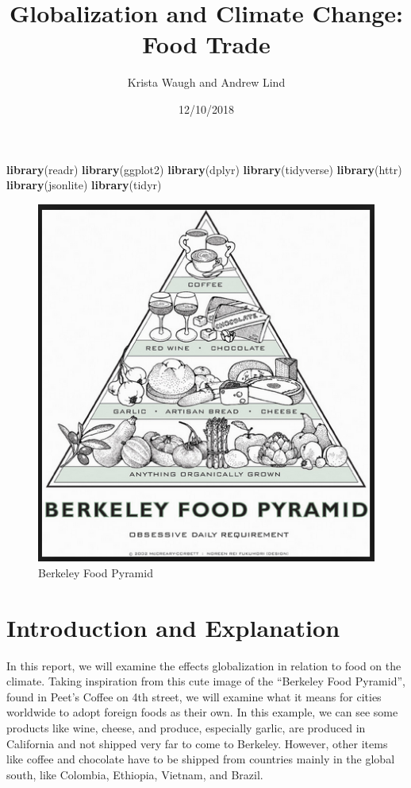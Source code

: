 \documentclass[]{article}
\title{Globalization and Climate Change: Food Trade}
\author{Krista Waugh and Andrew Lind}
\date{12/10/2018}
\newenvironment{Shaded}{\begin{snugshade}}{\end{snugshade}}
\newcommand{\KeywordTok}[1]{\textcolor[rgb]{0.13,0.29,0.53}{\textbf{#1}}}
\newcommand{\NormalTok}[1]{#1}
\begin{document}
\maketitle

\begin{Shaded}
\begin{Highlighting}[]
\KeywordTok{library}\NormalTok{(readr)}
\KeywordTok{library}\NormalTok{(ggplot2)}
\KeywordTok{library}\NormalTok{(dplyr)}
\KeywordTok{library}\NormalTok{(tidyverse)}
\KeywordTok{library}\NormalTok{(httr)}
\KeywordTok{library}\NormalTok{(jsonlite)}
\KeywordTok{library}\NormalTok{(tidyr)}
\end{Highlighting}
\end{Shaded}

\begin{figure}

{\centering \includegraphics[width=0.5\linewidth,height=0.5\textheight]{pyramid} 

}

\caption{Berkeley Food Pyramid}\label{fig:pressure}
\end{figure}

\section{Introduction and
Explanation}\label{introduction-and-explanation}

In this report, we will examine the effects globalization in relation to
food on the climate. Taking inspiration from this cute image of the
``Berkeley Food Pyramid'', found in Peet's Coffee on 4th street, we will
examine what it means for cities worldwide to adopt foreign foods as
their own. In this example, we can see some products like wine, cheese,
and produce, especially garlic, are produced in California and not
shipped very far to come to Berkeley. However, other items like coffee
and chocolate have to be shipped from countries mainly in the global
south, like Colombia, Ethiopia, Vietnam, and Brazil.
\end{document}
